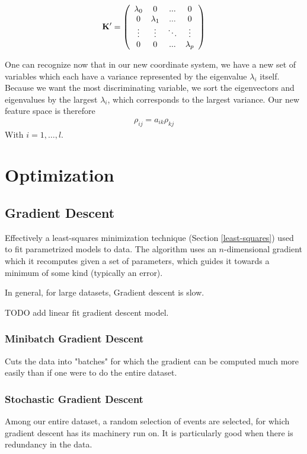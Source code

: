 $$\bf{K}' = \left(
{\begin{array}{cccc}
\lambda_0 & 0 &...&0 \\
0 & \lambda_1 & ...&0\\
\vdots & \vdots &\ddots & \vdots \\
0 & 0 & ... &\lambda_p
\end{array}}
\right)
$$

One can recognize now that in our new coordinate system, we have a new set of variables which each have a variance represented by the eigenvalue $\lambda_i$ itself. Because we want the most discriminating variable, we sort the eigenvectors and eigenvalues by the largest $\lambda_i$, which corresponds to the largest variance. Our new feature space is therefore
\begin{align}
	\rho_{ij} = a_{ik}\rho_{kj}
\end{align}
With $i=1,\dots,l$.

\section{Optimization}


\subsection{Gradient Descent}
Effectively a least-squares minimization technique (Section \ref{least-squares}) used to fit parametrized models to data. The algorithm uses an $n$-dimensional gradient which it recomputes given a set of parameters, which guides it towards a minimum of some kind (typically an error). 

In general, for large datasets, Gradient descent is slow.

TODO add linear fit gradient descent model.

\subsubsection{Minibatch Gradient Descent}
Cuts the data into "batches" for which the gradient can be computed much more easily than if one were to do the entire dataset.

\subsubsection{Stochastic Gradient Descent}
Among our entire dataset, a random selection of events are selected, for which gradient descent has its machinery run on. It is particularly good when there is redundancy in the data.

